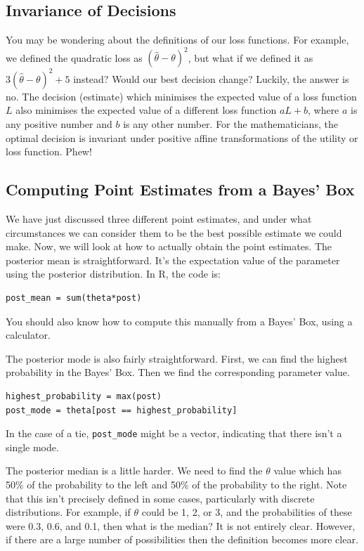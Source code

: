 \subsection{Invariance of Decisions}
You may be wondering about the definitions of our loss functions. For example,
we defined the quadratic loss as $(\hat{\theta} - \theta)^2$, but what if we
defined it as $3(\hat{\theta} - \theta)^2 + 5$ instead? Would our
best decision change? Luckily, the answer is no. The decision (estimate) which
minimises the expected value of a loss function $L$ also minimises the expected
value of a different loss function $aL + b$, where $a$ is any positive number
and $b$ is any other number.
For the mathematicians, the optimal decision is invariant under positive affine
transformations of the utility or loss function. Phew!

\subsection{Computing Point Estimates from a Bayes' Box}
We have just discussed three different point estimates, and under what
circumstances we can consider them to be the best possible estimate we could
make. Now, we will look at how to actually obtain the point estimates.
The posterior mean is straightforward. It's the expectation value of the parameter
using the posterior distribution. In R, the code is:
\begin{framed}
\begin{verbatim}
post_mean = sum(theta*post)
\end{verbatim}
\end{framed}
You should also know how to compute this manually from a Bayes' Box, using a
calculator.

The posterior mode is also fairly straightforward. First, we can find the
highest probability in the Bayes' Box. Then we find the corresponding parameter
value.
\begin{framed}
\begin{verbatim}
highest_probability = max(post)
post_mode = theta[post == highest_probability]
\end{verbatim}
\end{framed}
In the case of a tie, {\tt post\_mode} might be a vector, indicating
that there isn't a single mode.

The posterior median is a little harder. We need to find the $\theta$ value
which has 50\% of the probability to the left and 50\% of the probability to the
right. Note that this isn't precisely defined in some cases, particularly with
discrete distributions. For example, if $\theta$ could be 1, 2, or 3, and the
probabilities of these were 0.3, 0.6, and 0.1, then what is the median? It is
not entirely clear. However, if there are a large number of possibilities then
the definition becomes more clear.

